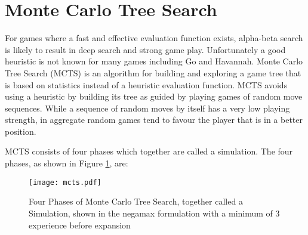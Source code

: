 






\section{Monte Carlo Tree Search}

For games where a fast and effective evaluation function exists, alpha-beta search is likely to result in deep search and strong game play. Unfortunately  a good heuristic is not known for many games including Go and Havannah. Monte Carlo Tree Search (MCTS) \cite{coulom2007efficient} is an algorithm for building and exploring a game tree that is based on statistics instead of a heuristic evaluation function. MCTS avoids using a heuristic by building its tree as guided by playing games of random move sequences. While a sequence of random moves by itself has a very low playing strength, in aggregate random games tend to favour the player that is in a better position.

MCTS consists of four phases \cite{chaslot2008progressive} which together are called a simulation. The four phases, as shown in Figure \ref{fig:mcts}, are:

\begin{figure}
	\centering

\texttt{[image: mcts.pdf]}
%

\caption[Four Phases of Monte Carlo Tree Search]{Four Phases of Monte Carlo Tree Search, together called a Simulation, shown in the negamax formulation with a minimum of 3 experience before expansion}
\label{fig:mcts}
\end{figure}

